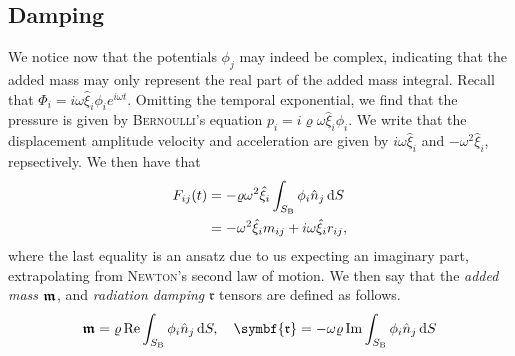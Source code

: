 \subsection{Damping}
We notice now that the potentials $\phi_j$ may indeed be complex, indicating that the added mass may only represent the real part of the added mass integral.
Recall that $\Phi_i = i\omega {\hat{\xi}}_i \phi_i e^{i\omega t}$.
Omitting the temporal exponential, we find that the pressure is given by \textsc{Bernoulli}'s equation $p_i = i \varrho \omega {\hat{\xi}}_i \phi_i$.
We write that the displacement amplitude velocity and acceleration are given by $i\omega {\hat{\xi}}_i$ and $-{\omega}^2 {\hat{\xi}}_i$, repsectively.
We then have that
\begin{equation*}
    \begin{aligned}
        F_{ij} (t) & = -\varrho {\omega}^2 {\hat{\xi}}_{i} \int_{S_{\mathrm{B}}} \phi_i {\hat{n}}_j \,\mathrm{d} S\\
        & = -{\omega}^2 {\hat{\xi}}_i m_{ij} + i\omega {\hat{\xi}}_i r_{ij},
    \end{aligned}
\end{equation*}
where the last equality is an ansatz due to us expecting an imaginary part, extrapolating from \textsc{Newton}'s second law of motion.
We then say that the \emph{added mass} $\bm{\mathfrak{m}}$, and \emph{radiation damping} $\symbf{\mathfrak{r}}$ tensors are defined as follows.
\[
    \addedmass = \varrho \Re \int_{S_{\mathrm{B}}} \phi_i {\hat{n}}_j \,\dee S, \quad \symbf{\mathfrak{r}} = -\omega\varrho \Im \int_{S_{\mathrm{B}}} \phi_i {\hat{n}}_j \,\dee S
\]

